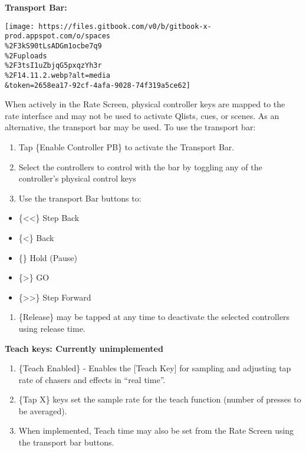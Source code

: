 \documentclass[
]{article}
\providecommand{\tightlist}{%
  \setlength{\itemsep}{0pt}\setlength{\parskip}{0pt}}
\begin{document}
\textbf{Transport Bar:}

\texttt{[image: https://files.gitbook.com/v0/b/gitbook-x-prod.appspot.com/o/spaces\\\%2F3kS90tLsADGm1ocbe7q9\\\%2Fuploads\\\%2F3tsI1uZbjqG5pxqzYh3r\\\%2F14.11.2.webp?alt=media\\\&token=2658ea17-92cf-4afa-9028-74f319a5ce62]}

When actively in the Rate Screen, physical controller keys are mapped to the rate interface and may not be used to activate Qlists, cues, or scenes. As an alternative, the transport bar may be used. To use the transport bar:

\begin{enumerate}
\def\labelenumi{\arabic{enumi}.}
\item
  Tap \{Enable Controller PB\} to activate the Transport Bar.
\item
  Select the controllers to control with the bar by toggling any of the controller's physical control keys
\item
  Use the transport Bar buttons to:
\end{enumerate}

\begin{itemize}
\item
  \{\textless\textless\} Step Back
\item
  \{\textbar\textless\} Back
\item
  \{\textbar\textbar\} Hold (Pause)
\item
  \{\textgreater\} GO
\item
  \{\textgreater\textgreater\} Step Forward
\end{itemize}

\begin{enumerate}
\def\labelenumi{\arabic{enumi}.}
\setcounter{enumi}{3}
\tightlist
\item
  \{Release\} may be tapped at any time to deactivate the selected controllers using release time.
\end{enumerate}

\textbf{Teach keys: Currently unimplemented}

\begin{enumerate}
\def\labelenumi{\arabic{enumi}.}
\item
  {\{Teach Enabled\} - Enables the {[}Teach Key{]} for sampling and adjusting tap rate of chasers and effects in ``real time''.}
\item
  {\{Tap X\} keys set the sample rate for the teach function (number of presses to be averaged). }
\item
  {When implemented, Teach time may also be set from the Rate Screen using the transport bar buttons.}
\end{enumerate}
\end{document}
